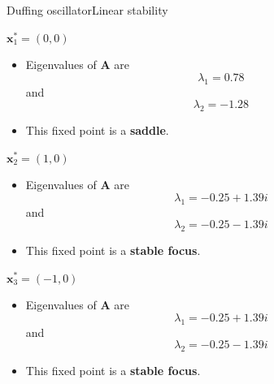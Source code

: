 \documentclass[usenames,dvipsnames,svgnames,10pt,aspectratio=169]{beamer}
\begin{document}
\begin{frame}[t, c]{Duffing oscillator}{Linear stability}
	\begin{minipage}{.31\textwidth}
		\begin{block}{\centering ${\bm x}^*_1 = (0, 0)$}
			\bigskip
			\begin{itemize}
				\item Eigenvalues of ${\bm A}$ are
				$$\lambda_1 = 0.78$$
				and
				$$\lambda_2 = -1.28$$

				\item This fixed point is a \alert{\textbf{saddle}}.
			\end{itemize}
		\end{block}
	\end{minipage}%
	\hfill
	\begin{minipage}{.31\textwidth}
		\begin{block}{\centering ${\bm x}^*_2 = (1, 0)$}
			\bigskip
			\begin{itemize}
				\item Eigenvalues of ${\bm A}$ are
				$$\lambda_1 = -0.25 + 1.39 i$$
				and
				$$\lambda_2 = -0.25 - 1.39 i$$

				\item This fixed point is a \alert{\textbf{stable focus}}.
			\end{itemize}
		\end{block}
	\end{minipage}%
	\hfill
	\begin{minipage}{.31\textwidth}
		\begin{block}{\centering ${\bm x}^*_3 = (-1, 0)$}
			\bigskip
			\begin{itemize}
				\item Eigenvalues of ${\bm A}$ are
				$$\lambda_1 = -0.25 + 1.39 i$$
				and
				$$\lambda_2 = -0.25 - 1.39 i$$

				\item This fixed point is a \alert{\textbf{stable focus}}.
			\end{itemize}
		\end{block}
	\end{minipage}

	\vspace{1cm}
\end{frame}
\end{document}
